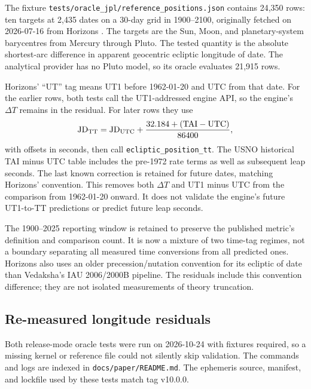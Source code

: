 \documentclass[11pt]{article}
\begin{document}
The fixture \texttt{tests/oracle\_jpl/reference\_positions.json} contains 24,350 rows:
ten targets at 2,435 dates on a 30-day grid in 1900--2100, originally fetched on
2026-07-16 from Horizons \citep{giorgini2015horizons}.
The targets are the Sun, Moon, and planetary-system barycentres from Mercury through
Pluto. The tested quantity is the absolute shortest-arc difference in apparent
geocentric ecliptic longitude of date.
The analytical provider has no Pluto model, so its oracle evaluates 21,915 rows.

Horizons' ``UT'' tag means UT1 before 1962-01-20 and UTC from that date.
For the earlier rows, both tests call the UT1-addressed engine API, so the engine's
$\Delta T$ remains in the residual. For later rows they use
\[
 \mathrm{JD}_{\rm TT}=\mathrm{JD}_{\rm UTC}
       +\frac{32.184+(\mathrm{TAI}-\mathrm{UTC})}{86400},
\]
with offsets in seconds, then call \texttt{ecliptic\_position\_tt}.
The USNO historical TAI minus UTC table includes the pre-1972 rate terms as well as
subsequent leap seconds. The last known correction is retained for future dates,
matching Horizons' convention. This removes both $\Delta T$ and UT1 minus UTC from
the comparison from 1962-01-20 onward. It does not validate the engine's future
UT1-to-TT predictions or predict future leap seconds.

The 1900--2025 reporting window is retained to preserve the published metric's
definition and comparison count. It is now a mixture of two time-tag regimes,
not a boundary separating all measured time conversions from all predicted ones.
Horizons also uses an older precession/nutation convention for its ecliptic of date
than Vedaksha's IAU 2006/2000B pipeline. The residuals include this convention
difference; they are not isolated measurements of theory truncation.

\subsection{Re-measured longitude residuals}

Both release-mode oracle tests were run on 2026-10-24 with fixtures required,
so a missing kernel or reference file could not silently skip validation.
The commands and logs are indexed in \texttt{docs/paper/README.md}.
The ephemeris source, manifest, and lockfile used by these tests match tag v10.0.0.
\end{document}
